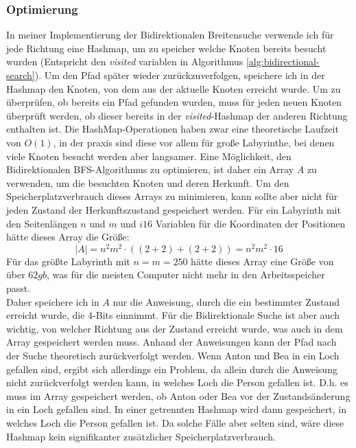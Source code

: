 \documentclass[a4paper,10pt,ngerman]{scrartcl}
\begin{document}
    \subsubsection{Optimierung}
    In meiner Implementierung der Bidirektionalen Breitensuche verwende ich für jede Richtung eine Hashmap, um zu speicher welche Knoten bereits besucht wurden (Entspricht den \textit{visited} variablen in Algorithmus \ref{alg:bidirectional-search}).
    Um den Pfad später wieder zurückzuverfolgen, speichere ich in der Hashmap den Knoten, von dem aus der aktuelle Knoten erreicht wurde.
    Um zu überprüfen, ob bereits ein Pfad gefunden wurden, muss für jeden neuen Knoten überprüft werden, ob dieser bereits in der \textit{visited}-Hashmap der anderen Richtung enthalten ist.
    Die HashMap-Operationen haben zwar eine theoretische Laufzeit von $O(1)$, in der praxis sind diese vor allem für große Labyrinthe, bei denen viele Knoten besucht werden aber langsamer.
    Eine Möglichkeit, den Bidirektionalen BFS-Algorithmus zu optimieren, ist daher ein Array $A$ zu verwenden, um die besuchten Knoten und deren Herkunft.
    Um den Speicherplatzverbrauch dieses Arrays zu minimieren, kann sollte aber nicht für jeden Zustand der Herkunftszustand gespeichert werden.
    Für ein Labyrinth mit den Seitenlängen $n$ und $m$ und $i16$ Variablen für die Koordinaten der Positionen hätte dieses Array die Größe:
    \[
        |A| = n^2 m^2 \cdot ((2 + 2) + (2 + 2)) = n^2 m^2 \cdot 16
    \]
    Für das größte Labyrinth mit $n = m = 250$ hätte dieses Array eine Größe von über $62gb$, was für die meisten Computer nicht mehr in den Arbeitsspeicher passt. \\
    Daher speichere ich in $A$ nur die Anweisung, durch die ein bestimmter Zustand erreicht wurde, die 4-Bits einnimmt.
    Für die Bidirektionale Suche ist aber auch wichtig, von welcher Richtung aus der Zustand erreicht wurde, was auch in dem Array gespeichert werden muss.
    Anhand der Anweisungen kann der Pfad nach der Suche theoretisch zurückverfolgt werden.
    Wenn Anton und Bea in ein Loch gefallen sind, ergibt sich allerdings ein Problem, da allein durch die Anweisung nicht zurückverfolgt werden kann, in welches Loch die Person gefallen ist.
    D.h. es muss im Array gespeichert werden, ob Anton oder Bea vor der Zustandsänderung in ein Loch gefallen sind.
    In einer getrennten Hashmap wird dann gespeichert, in welches Loch die Person gefallen ist.
    Da solche Fälle aber selten sind, wäre diese Hashmap kein signifikanter zusätzlicher Speicherplatzverbrauch.
\end{document}
